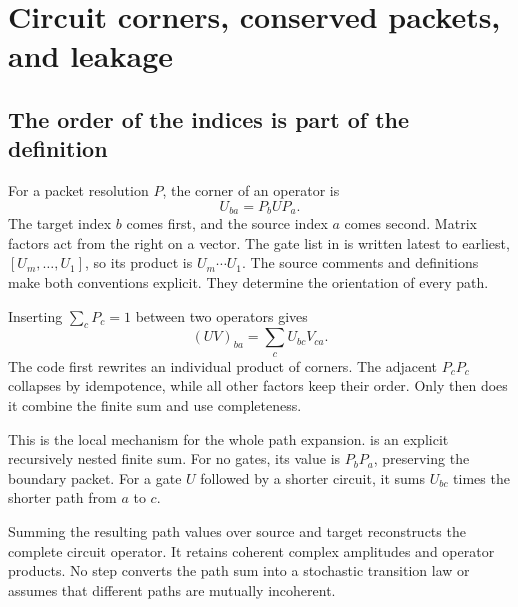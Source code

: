 \section{Circuit corners, conserved packets, and leakage}
\label{sec:dynamics}

\subsection{The order of the indices is part of the definition}
For a packet resolution $P$, the corner of an operator is
\[
U_{ba}=P_bUP_a.
\]
The target index $b$ comes first, and the source index $a$ comes second. Matrix factors act from the right on a vector. The gate list in  is written latest to earliest, $[U_m,\ldots,U_1]$, so its product is $U_m\cdots U_1$. The source comments and definitions make both conventions explicit. They determine the orientation of every path.


Inserting $\sum_cP_c=1$ between two operators gives
\[
(UV)_{ba}=\sum_c U_{bc}V_{ca}.
\]
The code first rewrites an individual product of corners. The adjacent $P_cP_c$ collapses by idempotence, while all other factors keep their order. Only then does it combine the finite sum and use completeness.


This is the local mechanism for the whole path expansion.  is an explicit recursively nested finite sum. For no gates, its value is $P_bP_a$, preserving the boundary packet. For a gate $U$ followed by a shorter circuit, it sums $U_{bc}$ times the shorter path from $a$ to $c$.



Summing the resulting path values over source and target reconstructs the complete circuit operator. It retains coherent complex amplitudes and operator products. No step converts the path sum into a stochastic transition law or assumes that different paths are mutually incoherent.

